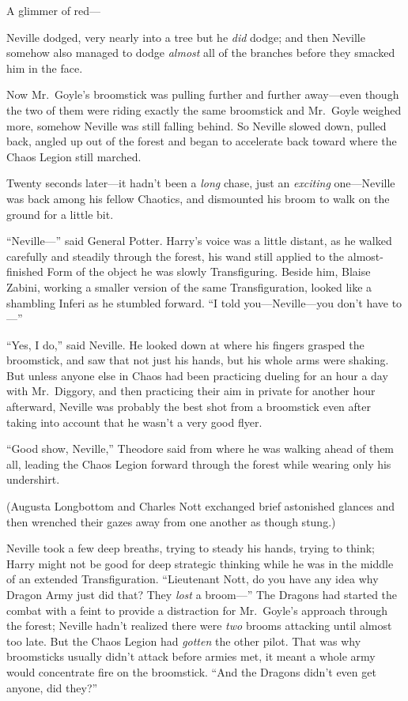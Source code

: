 A glimmer of red—

Neville dodged, very nearly into a tree but he \emph{did} dodge;
and then Neville somehow also managed to dodge \emph{almost} all of
the branches before they smacked him in the face.

Now Mr.~Goyle’s broomstick was pulling further and further away—even though the two of them were riding exactly the same
broomstick and Mr.~Goyle weighed more, somehow Neville was still
falling behind. So Neville slowed down, pulled back, angled up out
of the forest and began to accelerate back toward where the Chaos
Legion still marched.

Twenty seconds later—it hadn’t been a \emph{long} chase, just
an \emph{exciting} one—Neville was back among his fellow
Chaotics, and dismounted his broom to walk on the ground for a
little bit.

“Neville—” said General Potter. Harry’s voice was a little
distant, as he walked carefully and steadily through the forest,
his wand still applied to the almost-finished Form of the object he
was slowly Transfiguring. Beside him, Blaise Zabini, working a
smaller version of the same Transfiguration, looked like a
shambling Inferi as he stumbled forward. “I told you—Neville—you don’t have to—”

“Yes, I do,” said Neville. He looked down at where his fingers
grasped the broomstick, and saw that not just his hands, but his
whole arms were shaking. But unless anyone else in Chaos had been
practicing dueling for an hour a day with Mr.~Diggory, and then
practicing their aim in private for another hour afterward, Neville
was probably the best shot from a broomstick even after taking into
account that he wasn’t a very good flyer.

“Good show, Neville,” Theodore said from where he was walking
ahead of them all, leading the Chaos Legion forward through the
forest while wearing only his undershirt.

(Augusta Longbottom and Charles Nott exchanged brief astonished
glances and then wrenched their gazes away from one another as
though stung.)

Neville took a few deep breaths, trying to steady his hands,
trying to think; Harry might not be good for deep strategic
thinking while he was in the middle of an extended Transfiguration.
“Lieutenant Nott, do you have any idea why Dragon Army just did
that? They \emph{lost} a broom—” The Dragons had started the
combat with a feint to provide a distraction for Mr.~Goyle’s
approach through the forest; Neville hadn’t realized there were
\emph{two} brooms attacking until almost too late. But the Chaos
Legion had \emph{gotten} the other pilot. That was why broomsticks
usually didn’t attack before armies met, it meant a whole army
would concentrate fire on the broomstick. “And the Dragons didn’t
even get anyone, did they?”

